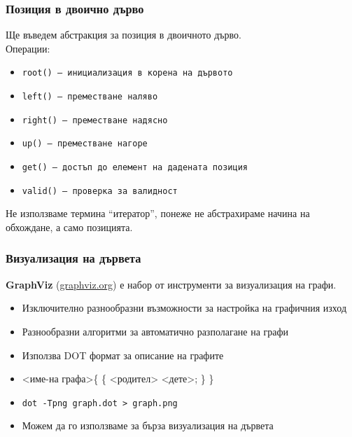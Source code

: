 \documentclass{beamer}
\begin{document}
\begin{frame}
  \frametitle{Позиция в двоично дърво}
  Ще въведем абстракция за позиция в двоичното дърво.\\[1em]
  Операции:
  \begin{itemize}
  \item \tt{root()} --- инициализация в корена на дървото
  \item \tt{left()} --- преместване наляво
  \item \tt{right()} --- преместване надясно
  \item \tt{up()} --- преместване нагоре
  \item \tt{get()} --- достъп до елемент на дадената позиция
  \item \tt{valid()} --- проверка за валидност
  \end{itemize}
  \pause
  \alert{Не използваме термина ``итератор'', понеже не абстрахираме начина на обхождане, а само позицията.}
\end{frame}

\begin{frame}
  \frametitle{Визуализация на дървета}
  \textbf{GraphViz} (\url{graphviz.org}) е набор от инструменти за визуализация на графи.

  \begin{itemize}
  \item Изключително разнообразни възможности за настройка на графичния изход
  \item Разнообразни алгоритми за автоматично разполагане на графи
  \item Използва DOT формат за описание на графите
  \item {}<име-на графа>\tta\{ \{ <родител> \tta{->} <дете>\tta; \} \tta\}
  \item \tt{dot -Tpng graph.dot > graph.png}
  \item Можем да го използваме за бърза визуализация на дървета
  \end{itemize}

\end{frame}
\end{document}
